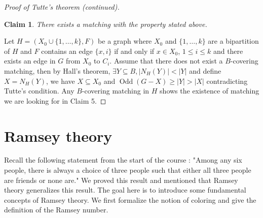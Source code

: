 \documentclass{tufte-handout}
\newtheorem{claim}{Claim}
\theoremstyle{definition}
\theoremstyle{remark}
\DeclareMathOperator{\odd}{Odd}
\begin{document}
\begin{proof}[Proof of Tutte's theorem (continued)]
	\begin{claim}
		There exists a matching with the property stated above.
	\end{claim}
	Let $H = (X_0 \cup \{1,\dots, k\}, F)$ be a graph where $X_0$ and $\{1,\dots, k\}$ are a bipartition of $H$ and $F$ contains an edge $\{x, i\}$ if and only if $x \in X_0$, $1\leq i \leq k$ and there exists an edge in $G$ from $X_0$ to $C_i$. Assume that there does not exist a $B$-covering matching, then by Hall's theorem, $\exists Y\subseteq B, |N_H(Y)| < |Y|$ and define $X = N_H(Y)$, we have $X \subseteq X_0$ and $\odd(G-X) \geq |Y| > |X|$ contradicting Tutte's condition. Any $B$-covering matching in $H$ shows the existence of matching we are looking for in Claim 5.
\end{proof}

\section{Ramsey theory}
Recall the following statement from the start of the course : "Among any six people, there is always a choice of three people such that either all three people are friends or none are." We proved this result and mentioned that Ramsey theory generalizes this result. The goal here is to introduce some fundamental concepts of Ramsey theory. We first formalize the notion of coloring and give the definition of the Ramsey number.
\end{document}
